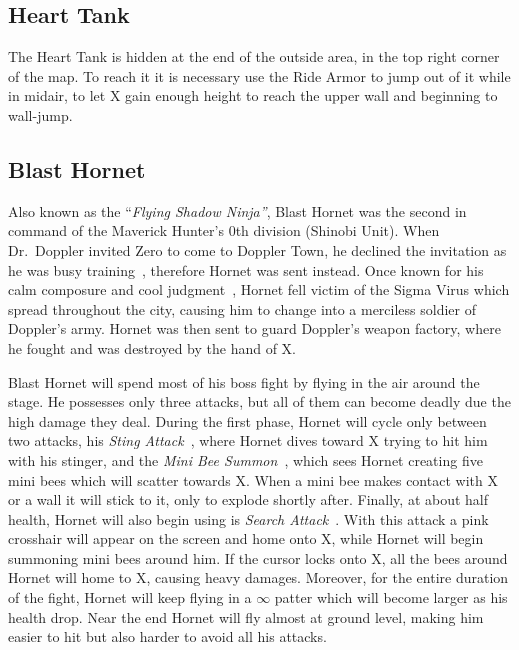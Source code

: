 \subsection{Heart Tank}
The Heart Tank is hidden at the end of the outside area, in the top right corner of the map. To reach it it is necessary use the Ride Armor to jump out of it while in midair, to let X gain enough height to reach the upper wall and beginning to wall-jump.

\subsection{Blast Hornet}\label{boss:Blast_hornet}
Also known as the ``\textit{Flying Shadow Ninja''}, Blast Hornet was the second in command of the Maverick Hunter's 0th division (Shinobi Unit). When Dr.~Doppler invited Zero to come to Doppler Town, he declined the invitation as he was busy training~\cite{wayback:X3_resources}, therefore Hornet was sent instead. Once known  for his calm composure and cool judgment~\cite{wiki:Blast_hornet}, Hornet fell victim of the Sigma Virus which spread throughout the city, causing him to change into a merciless soldier of Doppler's army. Hornet was then sent to guard Doppler's weapon factory, where he fought and was destroyed by the hand of X.

Blast Hornet will spend most of his boss fight by flying in the air around the stage. He possesses only three attacks, but all of them can become deadly due the high damage they deal. During the first phase, Hornet will cycle only between two attacks, his \emph{Sting Attack}~\cite{book:Compendium}, where Hornet dives toward X trying to hit him with his stinger, and the \emph{Mini Bee Summon}~\cite{book:Compendium}, which sees Hornet creating five mini bees which will scatter towards X. When a mini bee makes contact with X or a wall it will stick to it, only to explode shortly after. Finally, at about half health, Hornet will also begin using is \emph{Search Attack}~\cite{book:Compendium}. With this attack a pink crosshair will appear on the screen and home onto X, while Hornet will begin summoning mini bees around him. If the cursor locks onto X, all the bees around Hornet will home to X, causing heavy damages. Moreover, for the entire duration of the fight, Hornet will keep flying in a $\infty$ patter which will become larger as his health drop. Near the end Hornet will fly almost at ground level, making him easier to hit but also harder to avoid all his attacks.

